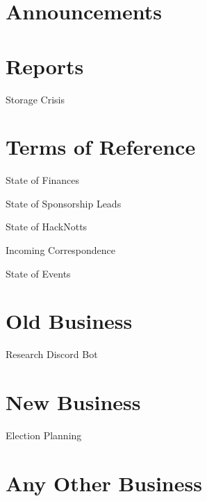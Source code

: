 \documentclass[11pt,hacksoc,agenda]{meetingmins}
\begin{document}
\maketitle

\section{Announcements}

\section{Reports}
\begin{items}
\item Storage Crisis
\end{items}

\section{Terms of Reference}
\begin{items}
\item {State of Finances}
\item {State of Sponsorship Leads}
\item {State of HackNotts}
\item {Incoming Correspondence}
\item {State of Events}
\end{items}

\section{Old Business}
\begin{items}
\item Research Discord Bot
\end{items}

\section{New Business}
\begin{items}
\item Election Planning
\end{items}

\section{Any Other Business}

\vspace{1em}
\end{document}
